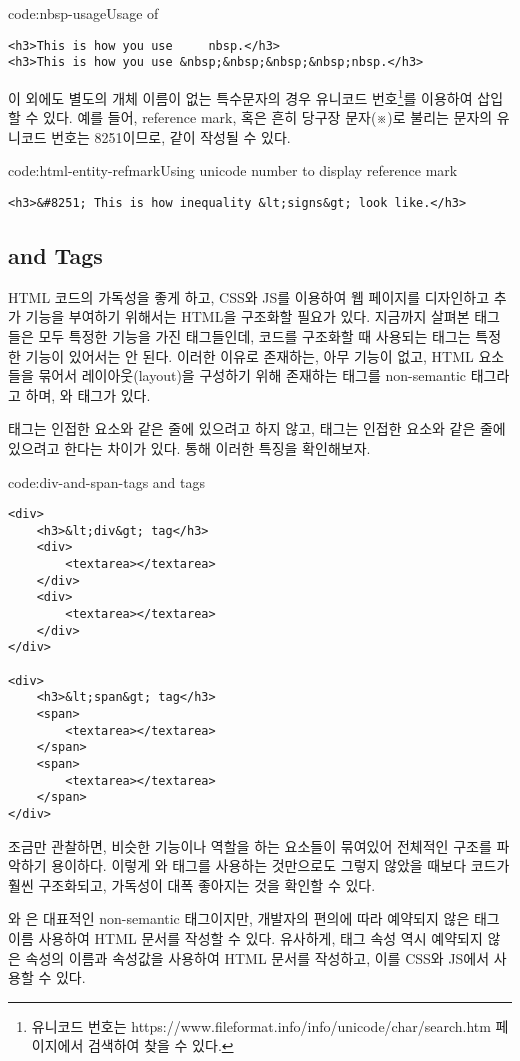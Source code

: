 \begin{code}{code:nbsp-usage}{Usage of }
\begin{verbatim}
<h3>This is how you use     nbsp.</h3>
<h3>This is how you use &nbsp;&nbsp;&nbsp;&nbsp;nbsp.</h3>
\end{verbatim}
\end{code}

이 외에도 별도의 개체 이름이 없는 특수문자의 경우 유니코드 번호\footnote{유니코드 번호는 https://www.fileformat.info/info/unicode/char/search.htm 페이지에서 검색하여 찾을 수 있다.}를 이용하여 삽입할 수 있다. 예를 들어, reference mark, 혹은 흔히 당구장 문자(※)로 불리는 문자의 유니코드 번호는 8251이므로, \와 같이 작성될 수 있다.

\begin{code}{code:html-entity-refmark}{Using unicode number to display reference mark}
\begin{verbatim}
<h3>&#8251; This is how inequality &lt;signs&gt; look like.</h3>
\end{verbatim}
\end{code}

\subsection*{ and  Tags}
HTML 코드의 가독성을 좋게 하고, CSS와 JS를 이용하여 웹 페이지를 디자인하고 추가 기능을 부여하기 위해서는 HTML을 구조화할 필요가 있다. 지금까지 살펴본 태그들은 모두 특정한 기능을 가진 태그들인데, 코드를 구조화할 때 사용되는 태그는 특정한 기능이 있어서는 안 된다. 이러한 이유로 존재하는, 아무 기능이 없고, HTML 요소들을 묶어서 레이아웃(layout)을 구성하기 위해 존재하는 태그를 non-semantic 태그라고 하며, 와  태그가 있다.

 태그는 인접한 요소와 같은 줄에 있으려고 하지 않고,  태그는 인접한 요소와 같은 줄에 있으려고 한다는 차이가 있다. \를 통해 이러한 특징을 확인해보자.

\begin{code}{code:div-and-span-tags}{ and  tags}
\begin{verbatim}
<div>
    <h3>&lt;div&gt; tag</h3>
    <div>
        <textarea></textarea>
    </div>
    <div>
        <textarea></textarea>
    </div>
</div>

<div>
    <h3>&lt;span&gt; tag</h3>
    <span>
        <textarea></textarea>
    </span>
    <span>
        <textarea></textarea>
    </span>
</div>
\end{verbatim}
\end{code}

\를 조금만 관찰하면, 비슷한 기능이나 역할을 하는 요소들이 묶여있어 전체적인 구조를 파악하기 용이하다. 이렇게 와  태그를 사용하는 것만으로도 그렇지 않았을 때보다 코드가 훨씬 구조화되고, 가독성이 대폭 좋아지는 것을 확인할 수 있다.

와 은 대표적인 non-semantic 태그이지만, 개발자의 편의에 따라 예약되지 않은 태그 이름 사용하여 HTML 문서를 작성할 수 있다. 유사하게, 태그 속성 역시 예약되지 않은 속성의 이름과 속성값을 사용하여 HTML 문서를 작성하고, 이를 CSS와 JS에서 사용할 수 있다.
